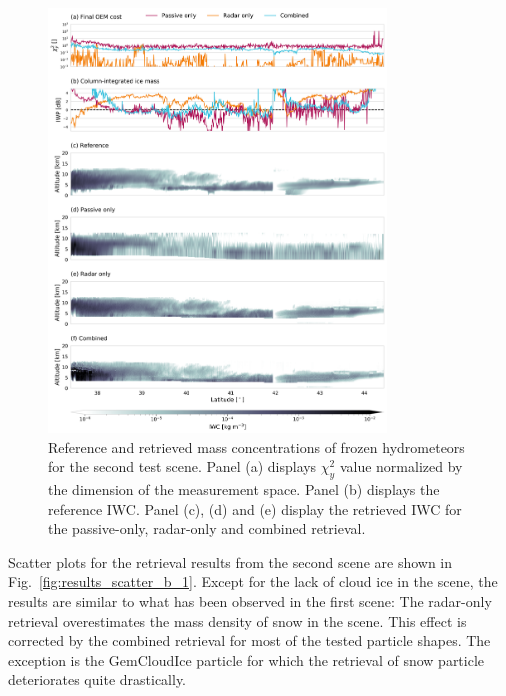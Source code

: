 \documentclass[journal abbreviation, manuscript]{copernicus}
\begin{document}
\begin{figure}
\centering
\includegraphics[width = 0.8\textwidth]{../plots/results_b_LargePlateAggregate}
\caption{Reference and retrieved mass concentrations of frozen hydrometeors for
  the second test scene. Panel (a) displays $\chi^2_y$ value normalized by the
  dimension of the measurement space. Panel (b) displays the reference IWC.
  Panel (c), (d) and (e) display the retrieved IWC for the passive-only,
  radar-only and combined retrieval.}
\label{fig:results_b}
\end{figure}

Scatter plots for the retrieval results from the second scene are shown in
Fig.~\ref{fig:results_scatter_b_1}. Except for the lack of cloud ice in the
scene, the results are similar to what has been observed in the first scene: The
radar-only retrieval overestimates the mass density of snow in the scene. This
effect is corrected by the combined retrieval for most of the tested particle
shapes. The exception is the GemCloudIce particle for which the retrieval of
snow particle deteriorates quite drastically.
\end{document}
